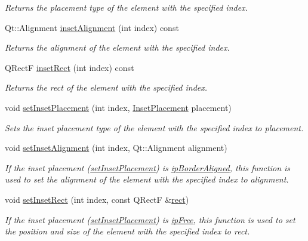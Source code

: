 \begin{DoxyCompactItemize}
\begin{DoxyCompactList}\small\item\em Returns the placement type of the element with the specified {\itshape index}. \end{DoxyCompactList}\item 
Qt\+::\+Alignment \hyperlink{classQCPLayoutInset_a78c0c494bb5728237cebb63ae8ef5c58}{inset\+Alignment} (int index) const 
\begin{DoxyCompactList}\small\item\em Returns the alignment of the element with the specified {\itshape index}. \end{DoxyCompactList}\item 
Q\+Rect\+F \hyperlink{classQCPLayoutInset_a5ec7037b3b8d20fbf9560e01779b1442}{inset\+Rect} (int index) const 
\begin{DoxyCompactList}\small\item\em Returns the rect of the element with the specified {\itshape index}. \end{DoxyCompactList}\item 
void \hyperlink{classQCPLayoutInset_a63298830744d5d8c5345511c00fd2144}{set\+Inset\+Placement} (int index, \hyperlink{classQCPLayoutInset_a8b9e17d9a2768293d2a7d72f5e298192}{Inset\+Placement} placement)
\begin{DoxyCompactList}\small\item\em Sets the inset placement type of the element with the specified {\itshape index} to {\itshape placement}. \end{DoxyCompactList}\item 
void \hyperlink{classQCPLayoutInset_a62882a4f9ad58bb0f53da12fde022abe}{set\+Inset\+Alignment} (int index, Qt\+::\+Alignment alignment)
\begin{DoxyCompactList}\small\item\em If the inset placement (\hyperlink{classQCPLayoutInset_a63298830744d5d8c5345511c00fd2144}{set\+Inset\+Placement}) is \hyperlink{classQCPLayoutInset_a8b9e17d9a2768293d2a7d72f5e298192aa81e7df4a785ddee2229a8f47c46e817}{ip\+Border\+Aligned}, this function is used to set the alignment of the element with the specified {\itshape index} to {\itshape alignment}. \end{DoxyCompactList}\item 
void \hyperlink{classQCPLayoutInset_aa487c8378a6f9533567a2e6430099dc3}{set\+Inset\+Rect} (int index, const Q\+Rect\+F \&\hyperlink{classQCPLayoutElement_affdfea003469aac3d0fac5f4e06171bc}{rect})
\begin{DoxyCompactList}\small\item\em If the inset placement (\hyperlink{classQCPLayoutInset_a63298830744d5d8c5345511c00fd2144}{set\+Inset\+Placement}) is \hyperlink{classQCPLayoutInset_a8b9e17d9a2768293d2a7d72f5e298192aa4802986ea2cea457f932b115acba59e}{ip\+Free}, this function is used to set the position and size of the element with the specified {\itshape index} to {\itshape rect}. \end{DoxyCompactList}\item 

\end{DoxyCompactItemize}
